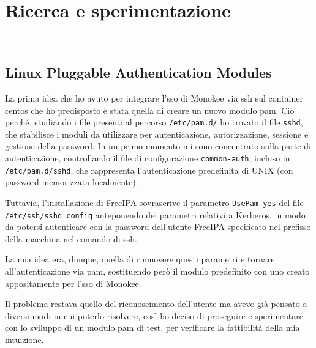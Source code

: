 
\chapter{Ricerca e sperimentazione}
\label{cap:ricerca-sperimentazione}

\\

\section{Linux Pluggable Authentication Modules}
\label{sec:tecnologie-strumenti}

La prima idea che ho avuto per integrare l'\acrshort{sso} di Monokee via \acrshort{ssh} sul container \acrshort{centos} che ho predisposto è stata quella di creare un nuovo modulo \acrshort{pam}. Ciò perché, studiando i file presenti al percorso \texttt{/etc/pam.d/} ho trovato il file \texttt{sshd}, che stabilisce i moduli da utilizzare per autenticazione, autorizzazione, sessione e gestione della password. In un primo momento mi sono concentrato sulla parte di autenticazione, controllando il file di configurazione \texttt{common-auth}, incluso in \texttt{/etc/pam.d/sshd}, che rappresenta l'autenticazione predefinita di UNIX (con password memorizzata localmente). 

Tuttavia, l'installazione di FreeIPA sovrascrive il parametro \texttt{UsePam yes} del file \texttt{/etc/ssh/sshd\_config} anteponendo dei parametri relativi a Kerberos, in modo da potersi autenticare con la password dell'utente FreeIPA specificato nel prefisso della macchina nel comando di \acrshort{ssh}.

La mia idea era, dunque, quella di rimuovere questi parametri e tornare all'autenticazione via \acrshort{pam}, sostituendo però il modulo predefinito con uno creato appositamente per l'\acrshort{sso} di Monokee.

Il problema restava quello del riconoscimento dell'utente ma avevo già pensato a diversi modi in cui poterlo risolvere, così ho deciso di proseguire e sperimentare con lo sviluppo di un modulo \acrshort{pam} di test, per verificare la fattibilità della mia intuizione.

